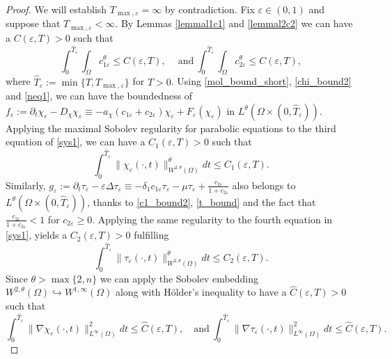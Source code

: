\documentclass[a4paper,10pt]{article}
\theoremstyle{definition}
\begin{document}
\begin{proof}
  We will establish $T_{\max, \varepsilon} = \infty$ by contradiction. Fix $\varepsilon \in (0, 1)$ and suppose that $T_{\max, \varepsilon} < \infty$. By Lemmas \ref{lemmal1c1} and \ref{lemmal2c2} we can have a $C(\varepsilon, T) > 0$ such that
  \begin{equation}
  \label{neq1}
    \int_0^{\widehat{T}_\varepsilon} \int_\Omega c_{1\varepsilon}^\theta \leq C(\varepsilon, T), \quad ~\text{and}~ \int_0^{\widehat{T}_\varepsilon} \int_\Omega c_{2\varepsilon}^\theta \leq C(\varepsilon, T),
  \end{equation}
  where $\widehat{T}_\varepsilon := \min\{T, T_{\max, \varepsilon}\}$ for $T > 0$. Using \eqref{mol_bound_short}, \eqref{chi_bound2} and \eqref{neq1}, we can have the boundedness of $f_\varepsilon := \partial_t \chi_\varepsilon - D_\chi \chi_\varepsilon \equiv - a_\chi(c_{1 \varepsilon} + c_{2 \varepsilon}) \chi_\varepsilon + F_\varepsilon(\chi_\varepsilon)$ in $L^\theta(\Omega \times (0, \widehat{T}_\varepsilon))$. Applying the maximal Sobolev regularity for parabolic equations \cite{matthias1997heat} to the third equation of \eqref{sys1}, we can have a $C_1(\varepsilon, T) > 0$ such that
  \begin{equation}
  \label{ge1}
    \int_0^{\widehat{T}_\varepsilon} \|\chi_\varepsilon(\cdot, t)\|^\theta_{W^{2, \theta}(\Omega)} dt \leq C_1(\varepsilon, T).
  \end{equation}
 Similarly, $g_\varepsilon := \partial_t \tau_\varepsilon - \varepsilon \Delta \tau_\varepsilon \equiv - \delta_1 c_{1\varepsilon} \tau_\varepsilon - \mu \tau_\varepsilon + \frac{c_{2\varepsilon}}{1 + c_{2\varepsilon}}$ also belongs to $L^\theta(\Omega \times (0, \widehat{T}_\varepsilon))$, thanks to \eqref{c1_bound2}, \eqref{t_bound} and the fact that $\frac{c_{2\varepsilon}}{1 + c_{2\varepsilon}} < 1$ for $c_{2\varepsilon} \geq 0$. Applying the same  regularity to the fourth equation in \eqref{sys1}, yields a $C_2(\varepsilon, T) > 0$ fulfilling
  \begin{equation}
  \label{ge2}
    \int_0^{\widehat{T}_\varepsilon} \|\tau_\varepsilon(\cdot, t)\|^\theta_{W^{2, \theta}(\Omega)} dt \leq C_2(\varepsilon, T).
  \end{equation}
  Since $\theta > \max\{2, n\}$ we can apply the Sobolev embedding $W^{2, \theta}(\Omega) \hookrightarrow W^{1, \infty}(\Omega)$ along with H\"{o}lder's inequality to have a $\widehat{C}(\varepsilon, T) > 0$ such that
  \begin{equation}
  \label{ge3}
    \int_0^{\widehat{T}_\varepsilon} \|\nabla \chi_\varepsilon(\cdot, t)\|^2_{L^\infty(\Omega)} dt \leq \widehat{C}(\varepsilon, T), \quad \text{and}~ \int_0^{\widehat{T}_\varepsilon} \|\nabla \tau_\varepsilon(\cdot, t)\|^2_{L^\infty(\Omega)} dt \leq \widehat{C}(\varepsilon, T).

\end{equation}
\end{proof}
\end{document}
